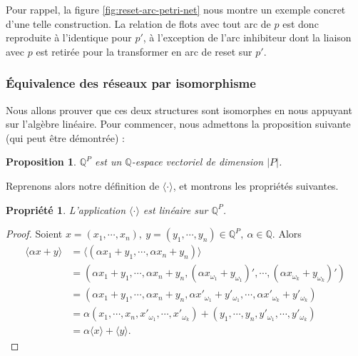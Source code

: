 \documentclass{article}
\newtheorem{property}{Propriété}
\newtheorem{proposition}{Proposition}
\theoremstyle{remark}
\theoremstyle{remark}
\newcommand{\extend}[1][\cdot]{\langle #1 \rangle}
\begin{document}
Pour rappel, la figure \ref{fig:reset-arc-petri-net} nous montre un exemple concret d'une telle construction. La relation de flots avec tout arc de $p$ est donc reproduite à l'identique pour $p'$, à l'exception de l'arc inhibiteur dont la liaison avec $p$ est retirée pour la transformer en arc de reset sur $p'$.

\subsubsection{Équivalence des réseaux par isomorphisme}

Nous allons prouver que ces deux structures sont isomorphes en nous appuyant sur l'algèbre linéaire. Pour commencer, nous admettons la proposition suivante (qui peut être démontrée) :

\begin{proposition}
    $\mathbb{Q}^P$ est un $\mathbb{Q}$-espace vectoriel de dimension $|P|$.
\end{proposition}

\noindent
Reprenons alors notre définition de $\extend$, et montrons les propriétés suivantes.

\begin{property}
    L'application $\extend$ est linéaire sur $\mathbb{Q}^P$.
\end{property}

\begin{proof}
    Soient $x = (x_1, \cdots, x_n),\ y = (y_1, \cdots, y_n) \in \mathbb{Q}^P,\ \alpha \in \mathbb{Q}$.
    Alors \begin{align*}
        \extend[\alpha x + y] & = \extend[(\alpha x_1 + y_1, \cdots, \alpha x_n + y_n)] \\
                              & = (\alpha x_1 + y_1, \cdots, \alpha x_n + y_n, (\alpha x_{\omega_1} + y_{\omega_1})', \cdots, (\alpha x_{\omega_k} + y_{\omega_k})') \\
                              & = (\alpha x_1 + y_1, \cdots, \alpha x_n + y_n, \alpha x'_{\omega_1} + y'_{\omega_1}, \cdots, \alpha x'_{\omega_k} + y'_{\omega_k}) \\
                              & = \alpha(x_1, \cdots, x_n, x'_{\omega_1}, \cdots, x'_{\omega_k}) + (y_1, \cdots, y_n, y'_{\omega_1}, \cdots, y'_{\omega_k}) \\
                              & = \alpha \extend[x] + \extend[y].
    \end{align*}
\end{proof}
\end{document}

